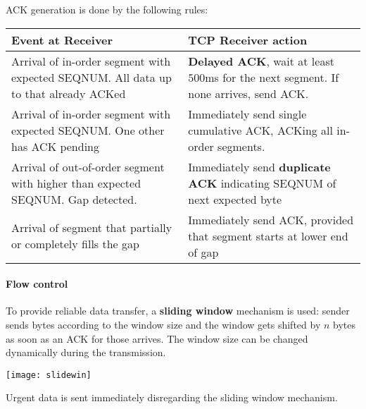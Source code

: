 \newpage\noindent
ACK generation is done by the following rules:
\begin{table}[!h]
	\centering
	\def\arraystretch{1.5}
	\begin{tabular}{p{4cm}|p{4cm}}
		\textbf{Event at Receiver} & \textbf{TCP Receiver action} \\
		\hline
		Arrival of in-order segment with expected SEQNUM. All data up to that already ACKed & \textbf{Delayed ACK}, wait at least $500$ms for the next segment. If none arrives, send ACK. \\
		\hline
		Arrival of in-order segment with expected SEQNUM. One other has ACK pending & Immediately send single cumulative ACK, ACKing all in-order segments.\\
		\hline
		Arrival of out-of-order segment with higher than expected SEQNUM. Gap detected. & Immediately send \textbf{duplicate ACK} indicating SEQNUM of next expected byte \\
		\hline
		Arrival of segment that partially or completely fills the gap & Immediately send ACK, provided that segment starts at lower end of gap
	\end{tabular}
\end{table}

\paragraph{Flow control} To provide reliable data transfer, a \textbf{sliding window} mechanism is used: sender sends bytes according to the window size and the window gets shifted by $n$ bytes as soon as an ACK for those arrives. The window size can be changed dynamically during the transmission.
\begin{center}
	\texttt{[image: slidewin]}
\end{center}
\begin{note}
	Urgent data is sent immediately disregarding the sliding window mechanism.
\end{note}

